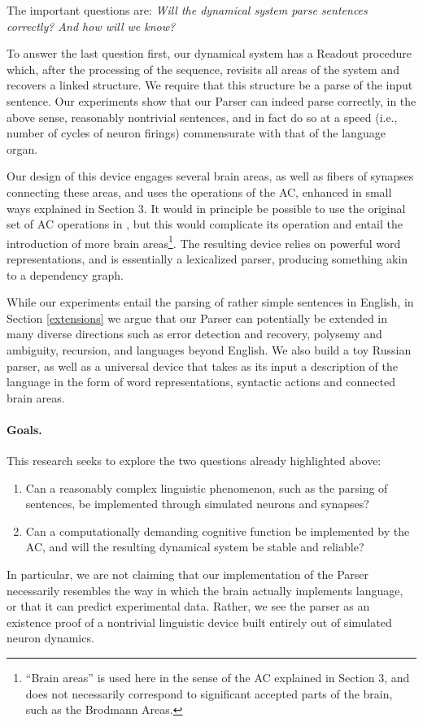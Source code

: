 The important questions are: {\em Will the dynamical system parse sentences correctly?  And how will we know?}

To answer the last question first, our dynamical system has a Readout procedure which, after the processing of the sequence, revisits all areas of the system and recovers a linked structure. We require that this structure be a parse of the input sentence.  Our experiments show that our Parser can indeed parse correctly, in the above sense, reasonably nontrivial sentences, and in fact do so at a speed  (i.e., number of cycles of neuron firings) commensurate with that of the language organ. 

Our design of this device engages several brain areas, as well as fibers of synapses connecting these areas, and uses the operations of the AC, enhanced in small ways explained in Section 3. It would in principle be possible to use the original set of AC operations in \citet{PNAS}, but this would complicate its operation and entail the introduction of more brain areas\footnote{``Brain areas'' is used here in the sense of the AC explained in Section 3, and does not necessarily correspond to significant accepted parts of the brain, such as the Brodmann Areas.}.  The resulting device relies on powerful word representations, and is essentially a lexicalized 
parser, producing something akin to a dependency graph.  

While our experiments entail the parsing of rather simple sentences in English, in Section \ref{extensions} we argue that our Parser can potentially be extended in many diverse directions such as error detection and recovery, polysemy and ambiguity, recursion, and languages beyond English. We also build a toy Russian parser, as well as a universal device that takes as its input a description of the language in the form of word representations, syntactic actions and connected brain areas. 

\paragraph{Goals.}  This research seeks to explore the two questions already highlighted above:
\begin{enumerate}
\item {Can a reasonably complex linguistic phenomenon, such as the parsing of sentences, be implemented through simulated neurons and synapses?}
\item {Can a computationally demanding cognitive function be implemented by the AC, and will the resulting dynamical system be stable and reliable?}
\end{enumerate}
In particular, we are not claiming that our implementation of the Parser necessarily resembles the way in which the brain actually implements language, or that it can predict experimental data. Rather, we see the parser as an existence proof of a nontrivial linguistic device built entirely out of simulated neuron dynamics.  

